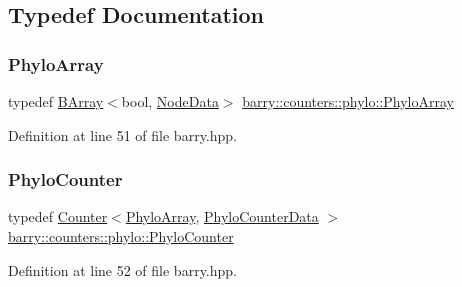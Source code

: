 \subsection{Typedef Documentation}
\mbox{\label{namespacebarry_1_1counters_1_1phylo_a50a6652c16ff57d76b4099043d6a0bbb}} 
\subsubsection{\texorpdfstring{Phylo\+Array}{PhyloArray}}
{\footnotesize\ttfamily typedef \hyperlink{classbarry_1_1_b_array}{B\+Array}$<$bool, \hyperlink{classbarry_1_1counters_1_1phylo_1_1_node_data}{Node\+Data}$>$ \hyperlink{namespacebarry_1_1counters_1_1phylo_a50a6652c16ff57d76b4099043d6a0bbb}{barry\+::counters\+::phylo\+::\+Phylo\+Array}}



Definition at line 51 of file barry.\+hpp.

\mbox{\label{namespacebarry_1_1counters_1_1phylo_a6523924ce3465c5b212584c57664f953}} 
\subsubsection{\texorpdfstring{Phylo\+Counter}{PhyloCounter}}
{\footnotesize\ttfamily typedef \hyperlink{classbarry_1_1_counter}{Counter}$<$\hyperlink{namespacebarry_1_1counters_1_1phylo_a50a6652c16ff57d76b4099043d6a0bbb}{Phylo\+Array}, \hyperlink{namespacebarry_1_1counters_1_1phylo_a6ecc0d8ab76f8dc2db152221a8e9e95a}{Phylo\+Counter\+Data} $>$ \hyperlink{namespacebarry_1_1counters_1_1phylo_a6523924ce3465c5b212584c57664f953}{barry\+::counters\+::phylo\+::\+Phylo\+Counter}}



Definition at line 52 of file barry.\+hpp.

\mbox{\label{namespacebarry_1_1counters_1_1phylo_a6ecc0d8ab76f8dc2db152221a8e9e95a}} 
